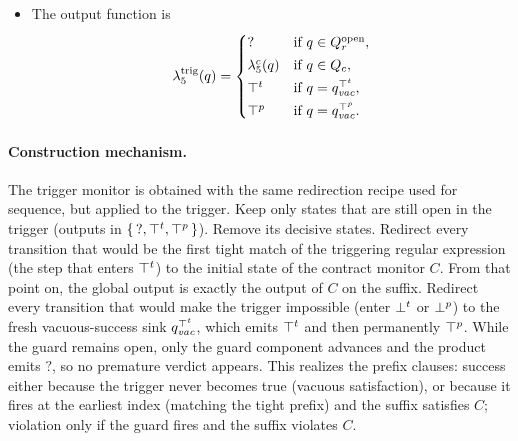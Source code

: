 \begin{definition}
\begin{itemize}
\begin{enumerate}
      \item  \textbf{Contract-active region ($y\in Q_c$).} 
      \[
        \delta_{\trigg}(y,A) := \delta_c(y,A).
      \]
      
      \item \textbf{Vacuous success sinks.}
      \[
        \delta_{\trigg}(q_{\mathit{vac}}^{\topt}, A) := q_{\mathit{vac}}^{\topp}, \qquad
        \delta_{\trigg}(q_{\mathit{vac}}^{\topp}, A) := q_{\mathit{vac}}^{\topp}.
      \]
      \end{enumerate}
    
      \item The output function is
      \[
      \lambda_5^{\text{trig}}(q)=
      \begin{cases}
        \mathsf{?}
          & \text{if } q\in Q_r^{\text{open}},\\[2pt]
        \lambda_5^{c}(q)
          & \text{if } q\in Q_c,\\[2pt]
        \top^t
          & \text{if } q = q_{\mathit{vac}}^{\top^t},\\[2pt]
        \top^p
          & \text{if } q = q_{\mathit{vac}}^{\top^p}.
      \end{cases}
      \]
    \end{itemize}
    \end{definition}
    
    
    \paragraph{Construction mechanism.}
    The trigger monitor is obtained with the same redirection recipe used for sequence, but applied to the trigger.
    Keep only states that are still open in the trigger (outputs in \(\{\,\mathsf{?},\top^t,\top^p\,\}\)). Remove its decisive states.
    Redirect every transition that would be the first tight match of the triggering regular expression (the step that enters \(\top^t\)) to the initial state of the contract monitor \(C\).
    From that point on, the global output is exactly the output of \(C\) on the suffix.
    Redirect every transition that would make the trigger impossible (enter \(\bot^t\) or \(\bot^p\)) to the fresh vacuous-success sink \(q_{\mathit{vac}}^{\top^t}\), which emits \(\top^t\) and then permanently \(\top^p\).
    While the guard remains open, only the guard component advances and the product emits \(\mathsf{?}\), so no premature verdict appears.
    This realizes the prefix clauses: success either because the trigger never becomes true (vacuous satisfaction), or because it fires at the earliest index (matching the tight prefix) and the suffix satisfies \(C\);
    violation only if the guard fires and the suffix violates \(C\).
    
